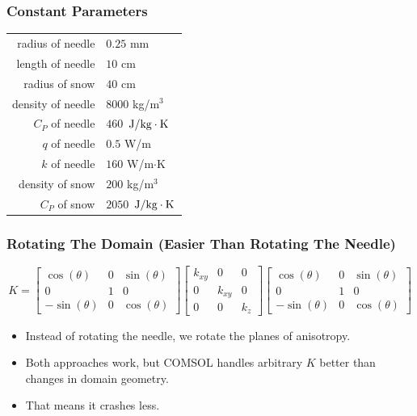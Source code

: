 \documentclass{beamer}
\begin{document}
\begin{frame}
\frametitle{Constant Parameters}
\begin{table}
\centering
\begin{tabular}{r | l}
radius of needle & \(0.25\) mm\\
length of needle & \(10\) cm\\
radius of snow & \(40\) cm\\
\hline
density of needle & \(8000\) kg/\(\textrm{m}^3\)\\
\(C_P\) of needle & \(460\) \(\left.{\textrm{J}}\middle/{\textrm{kg}\cdot\textrm{K}}\right.\) \\
\(q\) of needle & \(0.5\) W/m\\
\(k\) of needle & \(160\) W/m\(\cdot\)K\\
\hline
density of snow & \(200\) kg/\(\textrm{m}^3\)\\
\(C_P\) of snow & \(2050\)  \(\left.{\textrm{J}}\middle/{\textrm{kg}\cdot\textrm{K}}\right.\)
\end{tabular}
\end{table}
\end{frame}


\begin{frame}
\frametitle{Rotating The Domain (Easier Than Rotating The Needle)}
    \begin{equation*}
    K = \begin{bmatrix}
    \cos(\theta) & 0 & \sin(\theta)\\
    0 & 1 & 0\\
    -\sin(\theta) & 0 &\cos(\theta)
    \end{bmatrix}
    \begin{bmatrix}
    k_{xy} & 0 & 0\\
    0 & k_{xy} & 0\\
    0 & 0 & k_z
    \end{bmatrix}
    \begin{bmatrix}
    \cos(\theta) & 0 & \sin(\theta)\\
    0 & 1 & 0\\
    -\sin(\theta) & 0 &\cos(\theta)
    \end{bmatrix}
    \end{equation*}
    \begin{itemize}
    \item Instead of rotating the needle, we rotate the planes of anisotropy.
    \item Both approaches work, but COMSOL handles arbitrary \(K\) better than
          changes in domain geometry.
    \item That means it crashes less.
    \end{itemize}
\end{frame}
\end{document}
